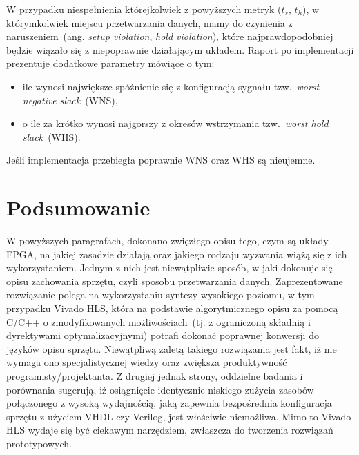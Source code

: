 \begin{itemize}
W przypadku niespełnienia którejkolwiek z powyższych metryk ($t_s$, $t_h$), w którymkolwiek miejscu przetwarzania danych, mamy do czynienia z naruszeniem~(ang. \textit{setup violation}, \textit{hold violation}), które najprawdopodobniej będzie wiązało się z niepoprawnie działającym układem. Raport po implementacji prezentuje dodatkowe parametry mówiące o tym:
\begin{itemize}
\item ile wynosi największe spóźnienie się z konfiguracją sygnału tzw.~\textit{worst negative slack}~(WNS),
\item o ile za krótko wynosi najgorszy z okresów wstrzymania tzw.~\textit{worst hold slack}~(WHS).
\end{itemize}
Jeśli implementacja przebiegła poprawnie WNS oraz WHS są nieujemne.

\end{itemize}


\section*{Podsumowanie}
W powyższych paragrafach, dokonano zwięzłego opisu tego, czym są układy FPGA, na jakiej zasadzie działają oraz jakiego rodzaju wyzwania wiążą się z ich wykorzystaniem. Jednym z nich jest niewątpliwie sposób, w jaki dokonuje się opisu zachowania sprzętu, czyli sposobu przetwarzania danych. Zaprezentowane rozwiązanie polega na wykorzystaniu syntezy wysokiego poziomu, w tym przypadku Vivado HLS, która na podstawie algorytmicznego opisu za pomocą C/C++ o zmodyfikowanych możliwościach~(tj. z ograniczoną składnią i dyrektywami optymalizacyjnymi) potrafi dokonać poprawnej konwersji do języków opisu sprzętu. Niewątpliwą zaletą takiego rozwiązania jest fakt, iż nie wymaga ono specjalistycznej wiedzy oraz zwiększa produktywność programisty/projektanta. Z drugiej jednak strony, oddzielne badania i porównania sugerują, iż osiągnięcie identycznie niskiego zużycia zasobów połączonego z wysoką wydajnością, jaką zapewnia bezpośrednia konfiguracja sprzętu z użyciem VHDL czy Verilog, jest właściwie niemożliwa. Mimo to Vivado HLS wydaje się być ciekawym narzędziem, zwłaszcza do tworzenia rozwiązań prototypowych.
